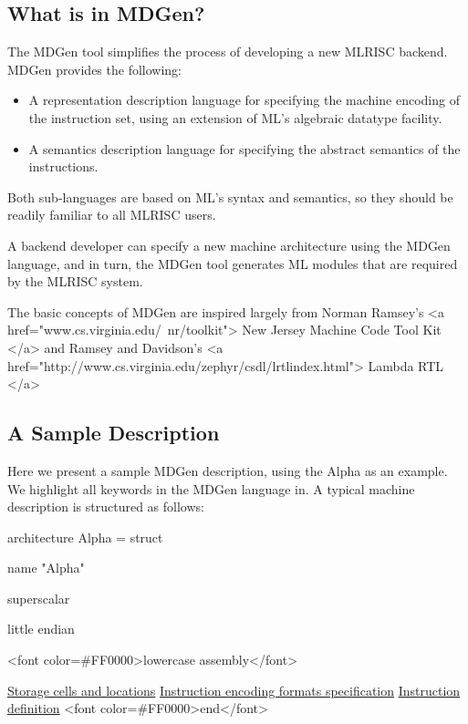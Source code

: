 \subsection{ What is in MDGen? }
The MDGen tool simplifies the process of developing a new MLRISC backend.  
MDGen provides the following:
\begin{itemize}
   \item A representation description language for specifying the
     machine encoding of the instruction set,
     using an extension of ML's algebraic datatype facility.
   \item A semantics description language for specifying the abstract semantics
      of the instructions.
\end{itemize}

Both sub-languages are based on ML's syntax and semantics, so
they should be readily familiar to all MLRISC users.

A backend developer can specify a new machine architecture using the MDGen 
language, and in turn, the MDGen tool generates ML modules that are
required by the MLRISC system.

The basic concepts of MDGen are inspired largely from 
Norman Ramsey's <a href="www.cs.virginia.edu/~nr/toolkit">
New Jersey Machine Code Tool Kit </a> and 
Ramsey and Davidson's
<a href="http://www.cs.virginia.edu/zephyr/csdl/lrtlindex.html">
Lambda RTL </a>

\subsection{A Sample Description}

Here we present a sample MDGen description, using the Alpha as an example.
We highlight all keywords in the MDGen language 
in.  A typical machine description
is structured as follows:

\begin{SML}
architecture Alpha =
   struct

   name "Alpha"

   superscalar

   little endian

   <font color=#FF0000>lowercase assembly</font>

   \href{#cells}{Storage cells and locations}
   \href{#encoding}{Instruction encoding formats specification}
   \href{#instruction}{Instruction definition}
<font color=#FF0000>end</font>
\end{SML}

